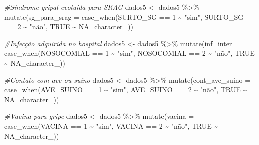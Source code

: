 \documentclass[
]{article}
\newenvironment{Shaded}{\begin{snugshade}}{\end{snugshade}}
\newcommand{\AttributeTok}[1]{\textcolor[rgb]{0.77,0.63,0.00}{#1}}
\newcommand{\CommentTok}[1]{\textcolor[rgb]{0.56,0.35,0.01}{\textit{#1}}}
\newcommand{\ConstantTok}[1]{\textcolor[rgb]{0.00,0.00,0.00}{#1}}
\newcommand{\DecValTok}[1]{\textcolor[rgb]{0.00,0.00,0.81}{#1}}
\newcommand{\FunctionTok}[1]{\textcolor[rgb]{0.00,0.00,0.00}{#1}}
\newcommand{\NormalTok}[1]{#1}
\newcommand{\OtherTok}[1]{\textcolor[rgb]{0.56,0.35,0.01}{#1}}
\newcommand{\SpecialCharTok}[1]{\textcolor[rgb]{0.00,0.00,0.00}{#1}}
\newcommand{\StringTok}[1]{\textcolor[rgb]{0.31,0.60,0.02}{#1}}
\begin{document}
\begin{Shaded}
\begin{Highlighting}[]
\CommentTok{\#Síndrome gripal evoluída para SRAG}
\NormalTok{dados5 }\OtherTok{\textless{}{-}}\NormalTok{  dados5 }\SpecialCharTok{\%\textgreater{}\%}
  \FunctionTok{mutate}\NormalTok{(}\AttributeTok{sg\_para\_srag =} \FunctionTok{case\_when}\NormalTok{(SURTO\_SG }\SpecialCharTok{==} \DecValTok{1} \SpecialCharTok{\textasciitilde{}} \StringTok{"sim"}\NormalTok{,}
\NormalTok{                                  SURTO\_SG }\SpecialCharTok{==} \DecValTok{2} \SpecialCharTok{\textasciitilde{}} \StringTok{"não"}\NormalTok{,}
                                  \ConstantTok{TRUE} \SpecialCharTok{\textasciitilde{}} \ConstantTok{NA\_character\_}\NormalTok{))}

\CommentTok{\#Infecção adquirida no hospital}
\NormalTok{dados5 }\OtherTok{\textless{}{-}}\NormalTok{  dados5 }\SpecialCharTok{\%\textgreater{}\%}
  \FunctionTok{mutate}\NormalTok{(}\AttributeTok{inf\_inter =} \FunctionTok{case\_when}\NormalTok{(NOSOCOMIAL }\SpecialCharTok{==} \DecValTok{1} \SpecialCharTok{\textasciitilde{}} \StringTok{"sim"}\NormalTok{,}
\NormalTok{                               NOSOCOMIAL }\SpecialCharTok{==} \DecValTok{2} \SpecialCharTok{\textasciitilde{}} \StringTok{"não"}\NormalTok{,}
                               \ConstantTok{TRUE} \SpecialCharTok{\textasciitilde{}} \ConstantTok{NA\_character\_}\NormalTok{))}

\CommentTok{\#Contato com ave ou suíno}
\NormalTok{dados5 }\OtherTok{\textless{}{-}}\NormalTok{  dados5 }\SpecialCharTok{\%\textgreater{}\%}
  \FunctionTok{mutate}\NormalTok{(}\AttributeTok{cont\_ave\_suino =} \FunctionTok{case\_when}\NormalTok{(AVE\_SUINO }\SpecialCharTok{==} \DecValTok{1} \SpecialCharTok{\textasciitilde{}} \StringTok{"sim"}\NormalTok{,}
\NormalTok{                                    AVE\_SUINO }\SpecialCharTok{==} \DecValTok{2} \SpecialCharTok{\textasciitilde{}} \StringTok{"não"}\NormalTok{,}
                                    \ConstantTok{TRUE} \SpecialCharTok{\textasciitilde{}} \ConstantTok{NA\_character\_}\NormalTok{))}

\CommentTok{\#Vacina para gripe}
\NormalTok{dados5 }\OtherTok{\textless{}{-}}\NormalTok{  dados5 }\SpecialCharTok{\%\textgreater{}\%}
  \FunctionTok{mutate}\NormalTok{(}\AttributeTok{vacina =} \FunctionTok{case\_when}\NormalTok{(VACINA }\SpecialCharTok{==} \DecValTok{1} \SpecialCharTok{\textasciitilde{}} \StringTok{"sim"}\NormalTok{,}
\NormalTok{                            VACINA }\SpecialCharTok{==} \DecValTok{2} \SpecialCharTok{\textasciitilde{}} \StringTok{"não"}\NormalTok{,}
                            \ConstantTok{TRUE} \SpecialCharTok{\textasciitilde{}} \ConstantTok{NA\_character\_}\NormalTok{))}


\end{Highlighting}
\end{Shaded}
\end{document}
